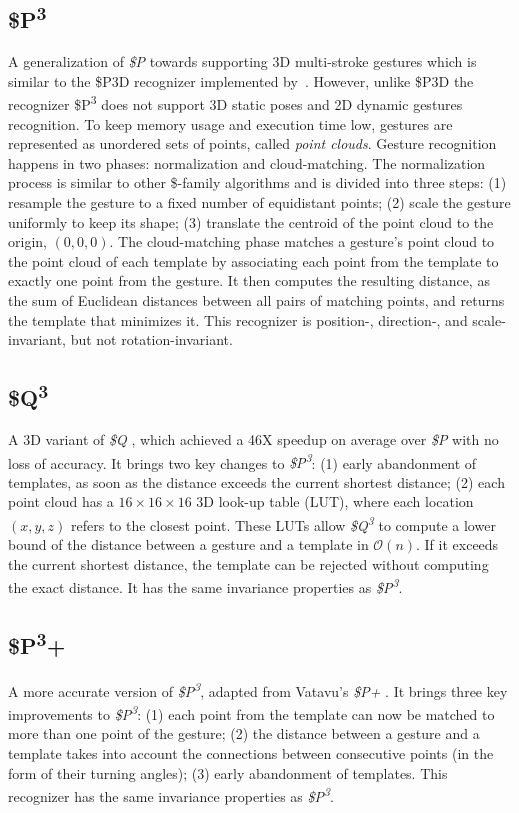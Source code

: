 \subsection{\$P\texorpdfstring{\textsuperscript{3}}{3}}
A generalization of \textit{\$P} \cite{Vatavu:2012} towards supporting 3D multi-stroke gestures which is similar to the \$P3D recognizer implemented by~\cite{Cook:2016}. However, unlike \$P3D the recognizer \$P\textsuperscript{3} does not support 3D static poses and 2D dynamic gestures recognition. To keep memory usage and execution time low, gestures are represented as unordered sets of points, called \textit{point clouds}. Gesture recognition happens in two phases: normalization and cloud-matching. The normalization process is similar to other \$-family algorithms and is divided into three steps: (1) resample the gesture to a fixed number of equidistant points; (2) scale the gesture uniformly to keep its shape; (3) translate the centroid of the point cloud to the origin, \ie $(0, 0, 0)$. The cloud-matching phase matches a gesture's point cloud to the point cloud of each template by associating each point from the template to exactly one point from the gesture. It then computes the resulting distance, as the sum of Euclidean distances between all pairs of matching points, and returns the template that minimizes it. This recognizer is position-, direction-, and scale-invariant, but not rotation-invariant.

\subsection{\$Q\texorpdfstring{\textsuperscript{3}}{3}}
A 3D variant of \textit{\$Q} \cite{Vatavu:2018}, which achieved a 46X speedup on average over \textit{\$P} with no loss of accuracy. It brings two key changes to \textit{\$P\textsuperscript{3}}: (1) early abandonment of templates, as soon as the distance exceeds the current shortest distance; (2) each point cloud has a $16{\times}16{\times}16$ 3D look-up table (LUT), where each location $(x, y, z)$ refers to the closest point. These LUTs allow \textit{\$Q\textsuperscript{3}} to compute a lower bound of the distance between a gesture and a template in $\mathcal{O}(n)$. If it exceeds the current shortest distance, the template can be rejected without computing the exact distance. It has the same invariance properties as \textit{\$P\textsuperscript{3}}.
    
\subsection{\$P\texorpdfstring{\textsuperscript{3}}{3}+}
A more accurate version of \textit{\$P\textsuperscript{3}}, adapted from Vatavu's \textit{\$P+} \cite{Vatavu:2017a}. It brings three key improvements to \textit{\$P\textsuperscript{3}}: (1) each point from the template can now be matched to more than one point of the gesture; (2) the distance between a gesture and a template takes into account the connections between consecutive points (in the form of their turning angles); (3) early abandonment of templates. This recognizer has the same invariance properties as \textit{\$P\textsuperscript{3}}.

